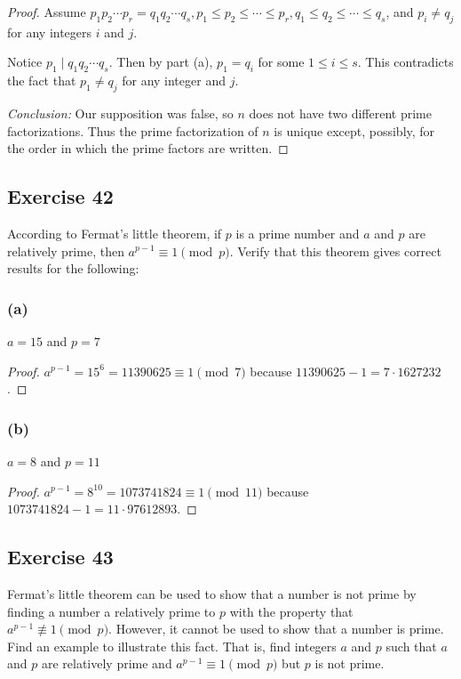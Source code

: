 \documentclass[14pt]{extarticle}
\begin{document}
\begin{proof}
        Assume \(p_1 p_2 \cdots p_r = q_1 q_2 \cdots q_s, p_1 \leq p_2 \leq \cdots \leq p_r, q_1 \leq q_2 \leq \cdots \leq
        q_s\), and \(p_i \neq q_j\) for any integers $i$ and $j$.

        Notice \(p_1 \mid q_1 q_2 \cdots q_s\). Then by part (a), \(p_1 = q_i\) for some \(1 \leq i \leq s\). This contradicts
        the fact that \(p_1 \neq q_j\) for any integer and $j$.

                {\it Conclusion:} Our supposition was false, so $n$ does not have two different prime factorizations. Thus the
        prime factorization of $n$ is unique except, possibly, for the order in which the prime factors are written.
\end{proof}

\subsection{Exercise 42}
According to Fermat’s little theorem, if $p$ is a prime number and $a$ and $p$ are relatively prime, then \(a^{p-1}
\equiv 1 \pmod p\). Verify that this theorem gives correct results for the following:

\subsubsection{(a)}
\(a = 15\) and \(p = 7\)

\begin{proof}
        \(a^{p-1} = 15^6 = 11390625 \equiv 1 \pmod 7\) because \(11390625 - 1 = 7 \cdot 1627232\).
\end{proof}

\subsubsection{(b)}
\(a = 8\) and \(p = 11\)

\begin{proof}
        \(a^{p-1} = 8^{10} = 1073741824 \equiv 1 \pmod 11\) because \(1073741824 - 1 = 11 \cdot 97612893\).
\end{proof}

\subsection{Exercise 43}
Fermat’s little theorem can be used to show that a number is not prime by finding a number a relatively prime to $p$
with the property that \(a^{p-1} \not\equiv 1 \pmod p\). However, it cannot be used to show that a number is prime.
Find an example to illustrate this fact. That is, find integers $a$ and $p$ such that $a$ and $p$ are relatively
prime and \(a^{p-1} \equiv 1 \pmod p\) but $p$ is not prime.
\end{document}
